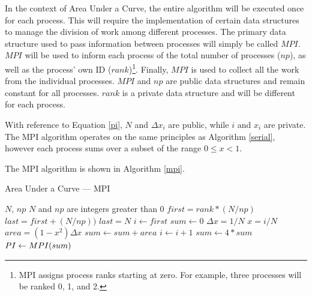 \documentclass[a4paper, 11pt]{article}
\begin{document}
In the context of Area Under a Curve, the entire algorithm will be executed once for each process. This will require the implementation of certain data structures to manage the division of work among different processes. The primary data structure used to pass information between processes will simply be called $MPI$. $MPI$ will be used to inform each process of the total number of processes ($np$), as well as the process' own ID ($rank$)\footnote{MPI assigns process ranks starting at zero. For example, three processes will be ranked 0, 1, and 2.}. Finally, $MPI$ is used to collect all the work from the individual processes. $MPI$ and $np$ are public data structures and remain constant for all processes. $rank$ is a private data structure and will be different for each process.

With reference to Equation \ref{pi}, $N$ and $\Delta x_i$ are public, while $i$ and $x_i$ are private. The MPI algorithm operates on the same principles as Algorithm \ref{serial}, however each process sums over a subset of the range $0 \leq x < 1$.

The MPI algorithm is shown in Algorithm \ref{mpi}.

\begin{algorithm}
\caption{Area Under a Curve --- MPI}
\label{mpi}
\begin{algorithmic}
\Require $N$, $np$
\Ensure $N$ and $np$ are integers greater than 0
\State {} 
\State {} 
\State $first = rank * (N / np)$ 
\State $last = first + (N / np))$ 
 
\State $last = N$ 
\EndIf
\State $i\gets first$ 
\State $sum\gets 0$ 
\State $\Delta x = 1 / N$ 
 
\State $x = i / N$ 
\State $area = (1 - x^2) \Delta x$ 
\State $sum \gets sum + area$ 
\State $i\gets i + 1$ 
\EndWhile
\State $sum \gets 4 * sum$ 
\State $PI\gets \Call{$MPI$}{sum}$ 
\end{algorithmic}
\end{algorithm}
\end{document}
